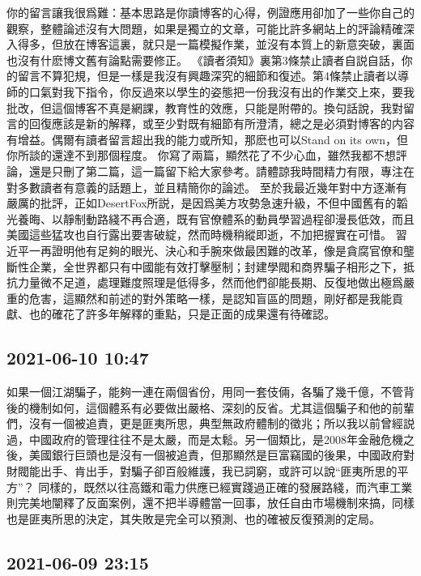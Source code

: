 \documentclass[twocolumn]{ctexart}
\begin{document}
你的留言讓我很爲難：基本思路是你讀博客的心得，例證應用卻加了一些你自己的觀察，整體論述沒有大問題，如果是獨立的文章，可能比許多網站上的評論精確深入得多，但放在博客這裏，就只是一篇模擬作業，並沒有本質上的新意突破，裏面也沒有什麽博文舊有論點需要修正。
《讀者須知》裏第3條禁止讀者自説自話，你的留言不算犯規，但是一樣是我沒有興趣深究的細節和復述。第4條禁止讀者以導師的口氣對我下指令，你反過來以學生的姿態把一份我沒有出的作業交上來，要我批改，但這個博客不真是網課，教育性的效應，只能是附帶的。換句話說，我對留言的回復應該是新的解釋，或至少對既有細節有所澄清，總之是必須對博客的内容有增益。偶爾有讀者留言超出我的能力或所知，那麽也可以Stand on its own，但你所談的還達不到那個程度。
你寫了兩篇，顯然花了不少心血，雖然我都不想評論，還是只刪了第二篇，這一篇留下給大家參考。請體諒我時間精力有限，專注在對多數讀者有意義的話題上，並且精簡你的論述。
至於我最近幾年對中方逐漸有嚴厲的批評，正如DesertFox所説，是因爲美方攻勢急速升級，不但中國舊有的韜光養晦、以靜制動路綫不再合適，既有官僚體系的動員學習過程卻漫長低效，而且美國這些猛攻也自行露出要害破綻，然而時機稍縱即逝，不加把握實在可惜。
習近平一再證明他有足夠的眼光、決心和手腕來做最困難的改革，像是貪腐官僚和壟斷性企業，全世界都只有中國能有效打擊壓制；封建學閥和商界騙子相形之下，抵抗力量微不足道，處理難度照理是低得多，然而他們卻能長期、反復地做出極爲嚴重的危害，這顯然和前述的對外策略一樣，是認知盲區的問題，剛好都是我能貢獻、也的確花了許多年解釋的重點，只是正面的成果還有待確認。
\subsection*{2021-06-10 10:47}

如果一個江湖騙子，能夠一連在兩個省份，用同一套伎倆，各騙了幾千億，不管背後的機制如何，這個體系有必要做出嚴格、深刻的反省。尤其這個騙子和他的前輩們，沒有一個被追責，更是匪夷所思，典型無政府體制的徵兆；所以我以前曾經説過，中國政府的管理往往不是太嚴，而是太鬆。另一個類比，是2008年金融危機之後，美國銀行巨頭也是沒有一個被追責，但那顯然是巨富竊國的後果，中國政府對財閥能出手、肯出手，對騙子卻百般維護，我已詞窮，或許可以說“匪夷所思的平方”？
同樣的，既然以往高鐵和電力供應已經實踐過正確的發展路綫，而汽車工業則完美地闡釋了反面案例，還不把半導體當一回事，放任自由市場機制來搞，同樣也是匪夷所思的決定，其失敗是完全可以預測、也的確被反復預測的定局。
\subsection*{2021-06-09 23:15}
\end{document}
